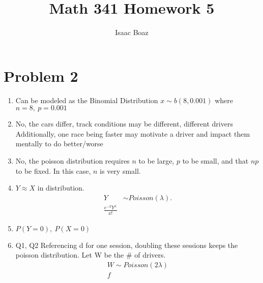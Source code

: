 \documentclass{article}
\title{Math 341 Homework 5}
\author{Isaac Boaz}
\begin{document}
\maketitle

\section*{Problem 2}
\begin{enumerate}[label=\alph*)]
    \item Can be modeled as the Binomial Distribution \(x \sim b(8, 0.001)\) where \(n = 8,\ p = 0.001\)
    \item No, the cars differ, track conditions may be different, different drivers
          Additionally, one race being faster may motivate a driver and impact them mentally to do better/worse
    \item No, the poisson distribution requires \(n\) to be large, \(p\) to be small, and that \(np\) to be fixed. In this case, \(n\) is very small.
    \item \(Y \approx X\) in distribution.
          \begin{align*}
              Y & \sim Poisson(\lambda). \\
              \frac{e^{-Y}Y^x}{x!}
          \end{align*}
    \item \(P(Y = 0),\ P(X = 0)\) %
    \item Q1, Q2
          Referencing d for one session, doubling these sessions keeps the poisson distribution.
          Let W be the \# of drivers.
          \begin{align*}
              W \sim Poisson(2\lambda) \\
              f
          \end{align*}
\end{enumerate}
\end{document}
